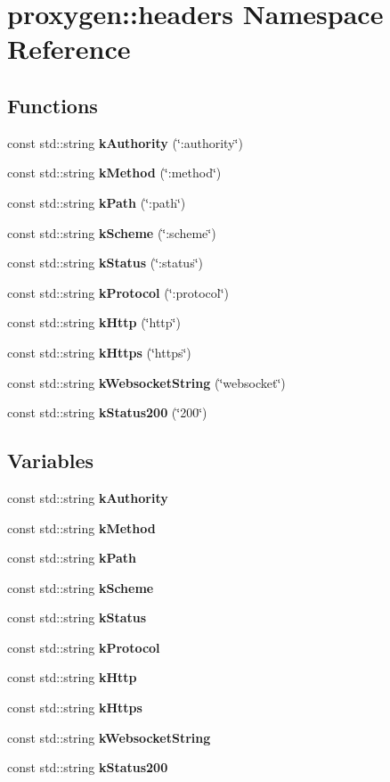 \section{proxygen\+:\+:headers Namespace Reference}
\label{namespaceproxygen_1_1headers}
\subsection*{Functions}
\begin{DoxyCompactItemize}
\item 
const std\+::string {\bf k\+Authority} (\char`\"{}\+:authority\char`\"{})
\item 
const std\+::string {\bf k\+Method} (\char`\"{}\+:method\char`\"{})
\item 
const std\+::string {\bf k\+Path} (\char`\"{}\+:path\char`\"{})
\item 
const std\+::string {\bf k\+Scheme} (\char`\"{}\+:scheme\char`\"{})
\item 
const std\+::string {\bf k\+Status} (\char`\"{}\+:status\char`\"{})
\item 
const std\+::string {\bf k\+Protocol} (\char`\"{}\+:protocol\char`\"{})
\item 
const std\+::string {\bf k\+Http} (\char`\"{}http\char`\"{})
\item 
const std\+::string {\bf k\+Https} (\char`\"{}https\char`\"{})
\item 
const std\+::string {\bf k\+Websocket\+String} (\char`\"{}websocket\char`\"{})
\item 
const std\+::string {\bf k\+Status200} (\char`\"{}200\char`\"{})
\end{DoxyCompactItemize}
\subsection*{Variables}
\begin{DoxyCompactItemize}
\item 
const std\+::string {\bf k\+Authority}
\item 
const std\+::string {\bf k\+Method}
\item 
const std\+::string {\bf k\+Path}
\item 
const std\+::string {\bf k\+Scheme}
\item 
const std\+::string {\bf k\+Status}
\item 
const std\+::string {\bf k\+Protocol}
\item 
const std\+::string {\bf k\+Http}
\item 
const std\+::string {\bf k\+Https}
\item 
const std\+::string {\bf k\+Websocket\+String}
\item 
const std\+::string {\bf k\+Status200}
\end{DoxyCompactItemize}


